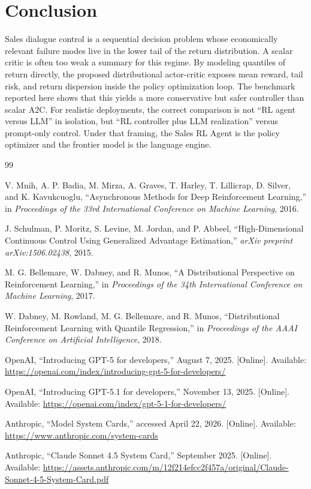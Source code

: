 \documentclass[conference]{IEEEtran}
\begin{document}
\section{Conclusion}
Sales dialogue control is a sequential decision problem whose economically relevant failure modes live in the lower tail of the return distribution. A scalar critic is often too weak a summary for this regime. By modeling quantiles of return directly, the proposed distributional actor-critic exposes mean reward, tail risk, and return dispersion inside the policy optimization loop. The benchmark reported here shows that this yields a more conservative but safer controller than scalar A2C. For realistic deployments, the correct comparison is not ``RL agent versus LLM'' in isolation, but ``RL controller plus LLM realization'' versus prompt-only control. Under that framing, the Sales RL Agent is the policy optimizer and the frontier model is the language engine.

\begin{thebibliography}{99}

V. Mnih, A. P. Badia, M. Mirza, A. Graves, T. Harley, T. Lillicrap, D. Silver, and K. Kavukcuoglu,
``Asynchronous Methods for Deep Reinforcement Learning,''
in \emph{Proceedings of the 33rd International Conference on Machine Learning}, 2016.

J. Schulman, P. Moritz, S. Levine, M. Jordan, and P. Abbeel,
``High-Dimensional Continuous Control Using Generalized Advantage Estimation,''
\emph{arXiv preprint arXiv:1506.02438}, 2015.

M. G. Bellemare, W. Dabney, and R. Munos,
``A Distributional Perspective on Reinforcement Learning,''
in \emph{Proceedings of the 34th International Conference on Machine Learning}, 2017.

W. Dabney, M. Rowland, M. G. Bellemare, and R. Munos,
``Distributional Reinforcement Learning with Quantile Regression,''
in \emph{Proceedings of the AAAI Conference on Artificial Intelligence}, 2018.

OpenAI,
``Introducing GPT-5 for developers,''
August 7, 2025.
[Online]. Available: \url{https://openai.com/index/introducing-gpt-5-for-developers/}

OpenAI,
``Introducing GPT-5.1 for developers,''
November 13, 2025.
[Online]. Available: \url{https://openai.com/index/gpt-5-1-for-developers/}

Anthropic,
``Model System Cards,''
accessed April 22, 2026.
[Online]. Available: \url{https://www.anthropic.com/system-cards}

Anthropic,
``Claude Sonnet 4.5 System Card,''
September 2025.
[Online]. Available: \url{https://assets.anthropic.com/m/12f214efcc2f457a/original/Claude-Sonnet-4-5-System-Card.pdf}

\end{thebibliography}
\end{document}
